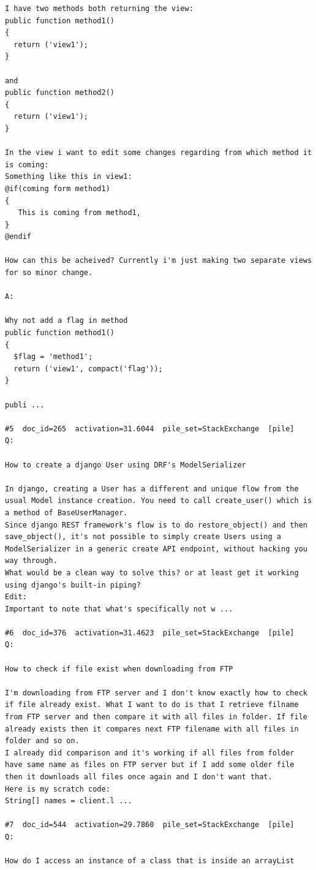 \begin{verbatim}
I have two methods both returning the view:
public function method1()
{
  return ('view1');
}

and 
public function method2()
{
  return ('view1');
}

In the view i want to edit some changes regarding from which method it is coming:
Something like this in view1:
@if(coming form method1)
{
   This is coming from method1,
}
@endif

How can this be acheived? Currently i'm just making two separate views for so minor change.

A:

Why not add a flag in method
public function method1()
{
  $flag = 'method1';
  return ('view1', compact('flag'));
}

publi ...

#5  doc_id=265  activation=31.6044  pile_set=StackExchange  [pile]
Q:

How to create a django User using DRF's ModelSerializer

In django, creating a User has a different and unique flow from the usual Model instance creation. You need to call create_user() which is a method of BaseUserManager.
Since django REST framework's flow is to do restore_object() and then save_object(), it's not possible to simply create Users using a ModelSerializer in a generic create API endpoint, without hacking you way through.
What would be a clean way to solve this? or at least get it working using django's built-in piping?
Edit:
Important to note that what's specifically not w ...

#6  doc_id=376  activation=31.4623  pile_set=StackExchange  [pile]
Q:

How to check if file exist when downloading from FTP

I'm downloading from FTP server and I don't know exactly how to check if file already exist. What I want to do is that I retrieve filname from FTP server and then compare it with all files in folder. If file already exists then it compares next FTP filename with all files in folder and so on. 
I already did comparison and it's working if all files from folder have same name as files on FTP server but if I add some older file then it downloads all files once again and I don't want that. 
Here is my scratch code:
String[] names = client.l ...

#7  doc_id=544  activation=29.7860  pile_set=StackExchange  [pile]
Q:

How do I access an instance of a class that is inside an arrayList


\end{verbatim}
